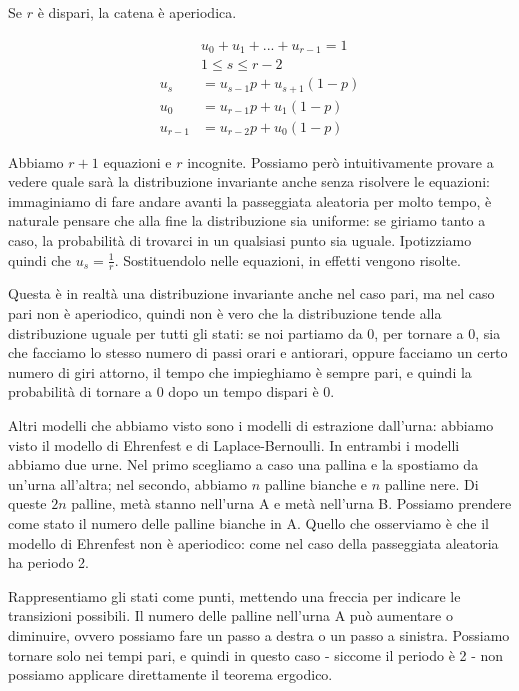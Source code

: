 \documentclass[a4paper,12pt]{book}
\begin{document}
Se $ r $ è dispari, la catena è aperiodica.

\begin{align*}
	& u_0 + u_1 + ... + u_{r-1} = 1 \\
	& 1 \le s \le r-2 \\
	u_s & = u_{s-1} p + u_{s+1}(1-p) \\
	u_0 & = u_{r-1}p + u_1(1-p) \\
	u_{r-1} & = u_{r-2} p + u_0(1-p)
\end{align*}

Abbiamo $ r+1 $ equazioni e $ r $ incognite. Possiamo però intuitivamente provare a vedere quale sarà la distribuzione invariante anche senza risolvere le equazioni: immaginiamo di fare andare avanti la passeggiata aleatoria per molto tempo, è naturale pensare che alla fine la distribuzione sia uniforme: se giriamo tanto a caso, la probabilità di trovarci in un qualsiasi punto sia uguale. Ipotizziamo quindi che $ u_s = \frac{1}{r} $. Sostituendolo nelle equazioni, in effetti vengono risolte. 

Questa è in realtà una distribuzione invariante anche nel caso pari, ma nel caso pari non è aperiodico, quindi non è vero che la distribuzione tende alla distribuzione uguale per tutti gli stati: se noi partiamo da 0, per tornare a 0, sia che facciamo lo stesso numero di passi orari e antiorari, oppure facciamo un certo numero di giri attorno, il tempo che impieghiamo è sempre pari, e quindi la probabilità di tornare a 0 dopo un tempo dispari è 0. 


Altri modelli che abbiamo visto sono i modelli di estrazione dall'urna: abbiamo visto il modello di Ehrenfest e di Laplace-Bernoulli. In entrambi i modelli abbiamo due urne. Nel primo scegliamo a caso una pallina e la spostiamo da un'urna all'altra; nel secondo, abbiamo $ n $ palline bianche e $ n $ palline nere. Di queste $ 2n $ palline, metà stanno nell'urna A e metà nell'urna B. Possiamo prendere come stato il numero delle palline bianche in A. Quello che osserviamo è che il modello di Ehrenfest non è aperiodico: come nel caso della passeggiata aleatoria ha periodo 2. 

Rappresentiamo gli stati come punti, mettendo una freccia per indicare le transizioni possibili. Il numero delle palline nell'urna A può aumentare o diminuire, ovvero possiamo fare un passo a destra o un passo a sinistra. Possiamo tornare solo nei tempi pari, e quindi in questo caso - siccome il periodo è 2 - non possiamo applicare direttamente il teorema ergodico. 
\end{document}
